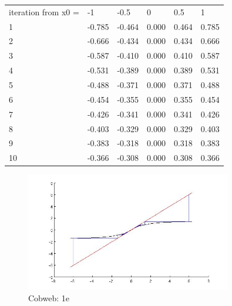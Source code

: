 \documentclass[12pt]{article}
\newenvironment{myenv}{\begin{adjustwidth}{1cm}{}}{\end{adjustwidth}}
\begin{document}
\begin{myenv}
\begin{table}[h]
\begin{tabular}{llllll}
iteration from x0 = & -1     & -0.5   & 0     & 0.5   & 1     \\
1                   & -0.785 & -0.464 & 0.000 & 0.464 & 0.785 \\
2                   & -0.666 & -0.434 & 0.000 & 0.434 & 0.666 \\
3                   & -0.587 & -0.410 & 0.000 & 0.410 & 0.587 \\
4                   & -0.531 & -0.389 & 0.000 & 0.389 & 0.531 \\
5                   & -0.488 & -0.371 & 0.000 & 0.371 & 0.488 \\
6                   & -0.454 & -0.355 & 0.000 & 0.355 & 0.454 \\
7                   & -0.426 & -0.341 & 0.000 & 0.341 & 0.426 \\
8                   & -0.403 & -0.329 & 0.000 & 0.329 & 0.403 \\
9                   & -0.383 & -0.318 & 0.000 & 0.318 & 0.383 \\
10                  & -0.366 & -0.308 & 0.000 & 0.308 & 0.366
\end{tabular}
\end{table}

\begin{figure} [H]
    \centering
    \includegraphics[width=0.8\textwidth]{cobweb1e}
    \caption{Cobweb: 1e}
    \label{figure:a4}
\end{figure}

\end{myenv}
\end{document}
